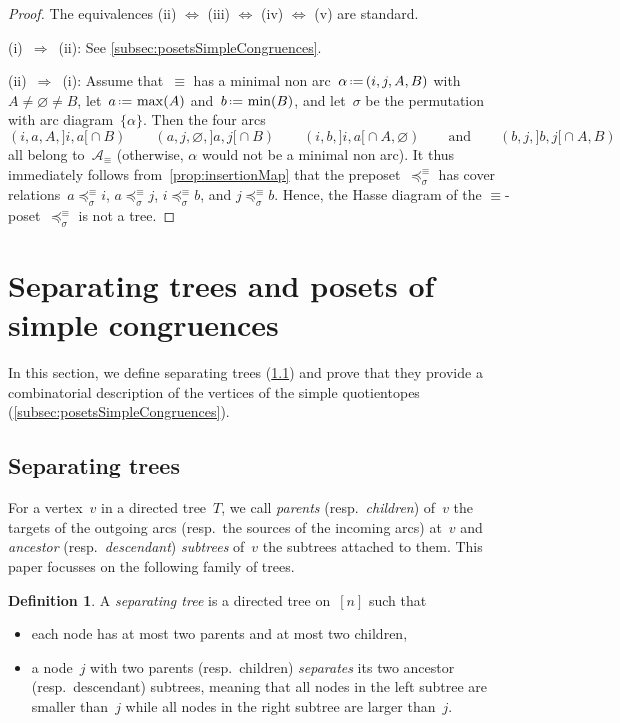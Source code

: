 \documentclass{amsart}
\theoremstyle{definition}
\newtheorem{definition}[theorem]{Definition}
\newcommand{\eqdef}{\mbox{\,\raisebox{0.2ex}{\scriptsize\ensuremath{\mathrm:}}\ensuremath{=}\,}} %
\newcommand{\darkblue}{\color{darkblue}} %
\newcommand{\defn}[1]{\textsl{\darkblue #1}} %
\newcommand{\arcs}{{\mathcal{A}}} %
\begin{document}
\begin{proof}
The equivalences (ii) $\iff$ (iii) $\iff$ (iv) $\iff$ (v) are standard.

(i)~$\Longrightarrow$~(ii): See \cref{subsec:posetsSimpleCongruences}.

(ii)~$\Longrightarrow$~(i): Assume that~$\equiv$ has a minimal non arc~$\alpha \eqdef (i, j, A, B)$ with~$A \ne \varnothing \ne B$, let~$a \eqdef \max(A)$ and~$b \eqdef \min(B)$, and let~$\sigma$ be the permutation with arc diagram~$\{\alpha\}$. Then the four arcs
\[
(i, a, A, {]i,a[} \cap B)
\qquad
(a, j, \varnothing, {]a,j[} \cap B)
\qquad
(i, b, {]i,a[} \cap A, \varnothing)
\qquad\text{and}\qquad
(b, j, {]b,j[} \cap A, B)
\]
all belong to~$\arcs_\equiv$ (otherwise, $\alpha$ would not be a minimal non arc).
It thus immediately follows from~\cref{prop:insertionMap} that the preposet~$\preccurlyeq_\sigma^\equiv$ has cover relations~$a \preccurlyeq_\sigma^\equiv i$, $a \preccurlyeq_\sigma^\equiv j$, $i \preccurlyeq_\sigma^\equiv b$, and $j \preccurlyeq_\sigma^\equiv b$.
Hence, the Hasse diagram of the $\equiv$-poset~$\preccurlyeq_\sigma^\equiv$ is not a tree.
\end{proof}


\section{Separating trees and posets of simple congruences}
\label{sec:separatingTreesPosetsSimpleCongruences}

In this section, we define separating trees (\cref{subsec:separatingTrees}) and prove that they provide a combinatorial description of the vertices of the simple quotientopes (\cref{subsec:posetsSimpleCongruences}).


\subsection{Separating trees}
\label{subsec:separatingTrees}

For a vertex~$v$ in a directed tree~$T$, we call \defn{parents} (resp.~\defn{children}) of~$v$ the targets of the outgoing arcs (resp.~the  sources of the incoming arcs) at~$v$ and \defn{ancestor} (resp.~\defn{descendant}) \defn{subtrees} of~$v$ the subtrees attached to them.
This paper focusses on the following family of trees.

\begin{definition}
\label{def:separatingTree}
A \defn{separating tree} is a directed tree on~$[n]$ such that
\begin{itemize}
\item each node has at most two parents and at most two children,
\item a node~$j$ with two parents (resp.~children) \defn{separates} its two ancestor (resp.~descendant) subtrees, meaning that all nodes in the left subtree are smaller than~$j$ while all nodes in the right subtree are larger than~$j$.
\end{itemize}
\end{definition}
\end{document}
